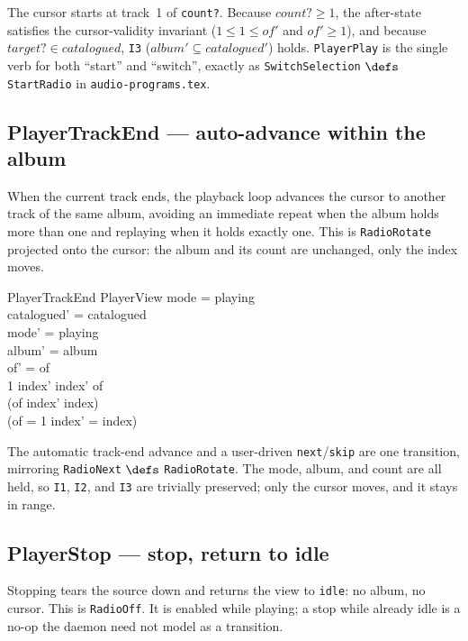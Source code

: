\documentclass[a4paper,10pt,fleqn]{article}
\begin{document}
The cursor starts at track~1 of \texttt{count?}. Because $count? \geq 1$, the
after-state satisfies the cursor-validity invariant ($1 \leq 1 \leq of'$ and
$of' \geq 1$), and because $target? \in catalogued$, \texttt{I3}
($album' \subseteq catalogued'$) holds. \texttt{PlayerPlay} is the single verb
for both ``start'' and ``switch'', exactly as \texttt{SwitchSelection} $\defs$
\texttt{StartRadio} in \texttt{audio-programs.tex}.

\subsection{PlayerTrackEnd --- auto-advance within the album}

When the current track ends, the playback loop advances the cursor to another
track of the same album, avoiding an immediate repeat when the album holds more
than one and replaying when it holds exactly one. This is \texttt{RadioRotate}
projected onto the cursor: the album and its count are unchanged, only the index
moves.

\begin{schema}{PlayerTrackEnd}
  \Delta PlayerView
  \where
  mode = playing \\
  catalogued' = catalogued \\
  mode' = playing \\
  album' = album \\
  of' = of \\
  1 \leq index' \land index' \leq of \\
  (of  \implies index' \neq index) \\
  (of = 1 \implies index' = index)
\end{schema}

The automatic track-end advance and a user-driven \texttt{next}/\texttt{skip} are
one transition, mirroring \texttt{RadioNext} $\defs$ \texttt{RadioRotate}. The
mode, album, and count are all held, so \texttt{I1}, \texttt{I2}, and \texttt{I3}
are trivially preserved; only the cursor moves, and it stays in range.

\subsection{PlayerStop --- stop, return to idle}

Stopping tears the source down and returns the view to \texttt{idle}: no album,
no cursor. This is \texttt{RadioOff}. It is enabled while playing; a stop while
already idle is a no-op the daemon need not model as a transition.
\end{document}
